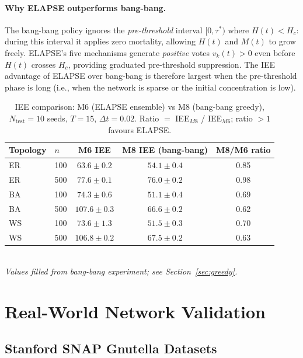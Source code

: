 \documentclass[review,12pt]{elsarticle}
\newcommand{\Hc}{H_c}
\begin{document}
\paragraph{Why ELAPSE outperforms bang-bang.}
The bang-bang policy ignores the \emph{pre-threshold} interval $[0, \tau^*)$
where $H(t) < \Hc$: during this interval it applies zero mortality, allowing
$H(t)$ and $M(t)$ to grow freely.  ELAPSE's five mechanisms generate
\emph{positive} votes $v_k(t) > 0$ even before $H(t)$ crosses $\Hc$, providing
graduated pre-threshold suppression.  The IEE advantage of ELAPSE over
bang-bang is therefore largest when the pre-threshold phase is long
(i.e., when the network is sparse or the initial concentration is low).

\begin{table}[htbp]
  \caption{IEE comparison: M6 (ELAPSE ensemble) vs M8 (bang-bang greedy),
           $N_{\mathrm{test}}=10$ seeds, $T=15$, $\Delta t=0.02$.
           Ratio $=$ IEE$_{M8}$ / IEE$_{M6}$; ratio $>1$ favours ELAPSE.}
  \label{tab:greedy}
  \centering
  \small
  \renewcommand{\arraystretch}{1.2}
  \begin{tabular}{llccc}
    \toprule
    Topology & $n$ & M6 IEE & M8 IEE (bang-bang) & M8/M6 ratio \\
    \midrule
    ER & 100 & $63.6\pm 0.2$ & $54.1\pm 0.4$ & 0.85 \\
    ER & 500 & $77.6\pm 0.1$ & $76.0\pm 0.2$ & 0.98 \\
    BA & 100 & $74.3\pm 0.6$ & $51.1\pm 0.4$ & 0.69 \\
    BA & 500 & $107.6\pm 0.3$ & $66.6\pm 0.2$ & 0.62 \\
    WS & 100 & $73.6\pm 1.3$ & $51.5\pm 0.3$ & 0.70 \\
    WS & 500 & $106.8\pm 0.2$ & $67.5\pm 0.2$ & 0.63 \\
    \bottomrule
  \end{tabular}
  \smallskip\\
  \small\textit{Values filled from bang-bang experiment; see Section~\ref{sec:greedy}.}
\end{table}

\section{Real-World Network Validation}
\label{sec:snap}

\subsection{Stanford SNAP Gnutella Datasets}
\end{document}
